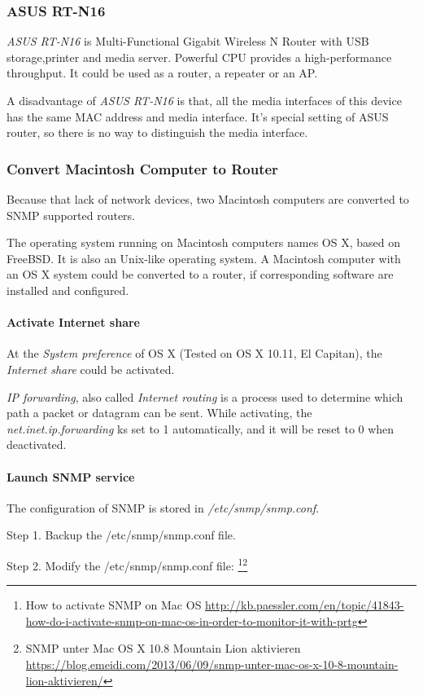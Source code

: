 \subsubsection{ASUS RT-N16}
\textit{ASUS RT-N16} is Multi-Functional Gigabit Wireless N Router with USB storage,printer and media server. Powerful CPU provides a high-performance throughput. It could be used as a router, a repeater or an AP.

A disadvantage of \textit{ASUS RT-N16} is that, all the media interfaces of this device has the same MAC address and media interface. It's special setting of ASUS router, so there is no way to distinguish the media interface.

\subsubsection{Convert Macintosh Computer to Router}

Because that lack of network devices, two Macintosh computers are converted to SNMP supported routers.

The operating system running on Macintosh computers names OS X, based on FreeBSD. It is also an Unix-like operating system. A Macintosh computer with an OS X system could be converted to a router, if corresponding software are installed and configured.

\paragraph{Activate Internet share}
At the \textit{System preference} of OS X (Tested on OS X 10.11, El Capitan), the \textit{Internet share} could be activated. 

\textit{IP forwarding}, also called \textit{Internet routing} is a process used to determine which path a packet or datagram can be sent. While activating, the \textit{net.inet.ip.forwarding} ks set to 1 automatically, and it will be reset to 0 when deactivated.

\paragraph{Launch SNMP service}

The configuration of SNMP is stored in \textit{/etc/snmp/snmp.conf}.

Step 1. Backup the /etc/snmp/snmp.conf file.

Step 2. Modify the /etc/snmp/snmp.conf file: \footnote{How to activate SNMP on Mac OS \url{http://kb.paessler.com/en/topic/41843-how-do-i-activate-snmp-on-mac-os-in-order-to-monitor-it-with-prtg}}\footnote{SNMP unter Mac OS X 10.8 Mountain Lion aktivieren \url{https://blog.emeidi.com/2013/06/09/snmp-unter-mac-os-x-10-8-mountain-lion-aktivieren/}}

